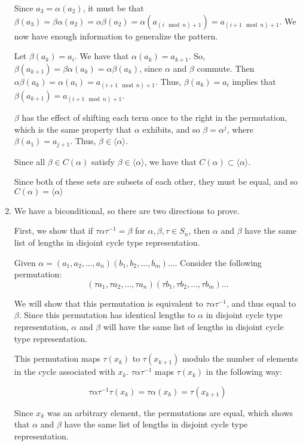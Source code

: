 \documentclass{article}
\begin{document}
\begin{enumerate}
    Since $a_3 = \alpha(a_2)$, it must be that $\beta(a_3) = \beta\alpha(a_2) = \alpha\beta(a_2) = \alpha(a_{(i \mod n) + 1}) = a_{(i+1 \mod n) + 1}$. We now have enough information to generalize the pattern.

    Let $\beta(a_k) = a_i$. We have that $\alpha(a_k) = a_{k+1}$. So, $\beta(a_{k+1}) = \beta\alpha(a_k) = \alpha\beta(a_k)$, since $\alpha$ and $\beta$ commute. Then $\alpha\beta(a_k) = \alpha(a_i) = a_{(i + 1 \mod n) + 1}$. Thus, $\beta(a_k) = a_i$ implies that $\beta(a_{k+1}) = a_{(i + 1 \mod n) + 1}$. 

    $\beta$ has the effect of shifting each term once to the right in the permutation, which is the same property that $\alpha$ exhibits, and so $\beta = \alpha^j$, where $\beta(a_1) = a_{j+1}$. Thus, $\beta \in \langle \alpha \rangle$.

    Since all $\beta \in C(\alpha)$ satisfy $\beta \in \langle \alpha \rangle$, we have that $C(\alpha) \subset \langle \alpha \rangle$.

    Since both of these sets are subsets of each other, they must be equal, and so $C(\alpha) = \langle \alpha \rangle$

    \item We have a biconditional, so there are two directions to prove. 

    First, we show that if $\tau\alpha\tau^{-1} = \beta$ for $\alpha, \beta, \tau \in S_n$, then $\alpha$ and $\beta$ have the same list of lengths in disjoint cycle type representation. 

    Given $\alpha = (a_1, a_2, \dots, a_n)(b_1, b_2, \dots, b_m)\dots$. Consider the following permutation: $$(\tau a_1, \tau a_2, \dots, \tau a_n)(\tau b_1, \tau b_2, \dots, \tau b_m)\dots$$

    We will show that this permutation is equivalent to $\tau \alpha \tau^{-1}$, and thus equal to $\beta$. Since this permutation has identical lengths to $\alpha$ in disjoint cycle type representation, $\alpha$ and $\beta$ will have the same list of lengths in disjoint cycle type representation.

    This permutation maps $\tau (x_k)$ to $\tau (x_{k+1})$ modulo the number of elements in the cycle associated with $x_k$. $\tau \alpha \tau^{-1}$ maps $\tau (x_k)$ in the following way:

    $$\tau \alpha \tau^{-1} \tau (x_k) = \tau \alpha (x_k) = \tau (x_{k+1})$$

    Since $x_k$ was an arbitrary element, the permutations are equal, which shows that $\alpha$ and $\beta$ have the same list of lengths in disjoint cycle type representation.


\end{enumerate}
\end{document}
